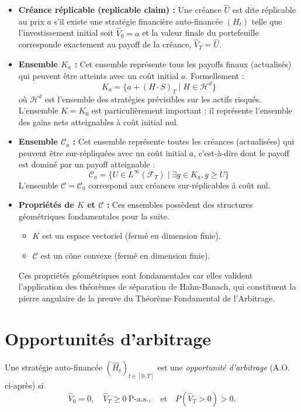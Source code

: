 \begin{itemize}
    \item \textbf{Créance réplicable (replicable claim) :} Une créance $\hat{U}$ est dite réplicable au prix $a$ s'il existe une stratégie financière auto-financée $(H_t)$ telle que l'investissement initial soit $\hat{V}_0 = a$ et la valeur finale du portefeuille corresponde exactement au payoff de la créance, $\hat{V}_T = \hat{U}$.
    \item \textbf{Ensemble $K_a$ :} Cet ensemble représente tous les payoffs finaux (actualisés) qui peuvent être atteints avec un coût initial $a$. Formellement :
    \[
    K_a = \{ a + (H \cdot S)_T \mid H \in \mathcal{H}^d \}
    \]
    où $\mathcal{H}^d$ est l'ensemble des stratégies prévisibles sur les actifs risqués. L'ensemble $K = K_0$ est particulièrement important : il représente l'ensemble des gains nets atteignables à coût initial nul.
    \item \textbf{Ensemble $\mathcal{C}_a$ :} Cet ensemble représente toutes les créances (actualisées) qui peuvent être sur-répliquées avec un coût initial $a$, c'est-à-dire dont le payoff est dominé par un payoff atteignable :
    \[
    \mathcal{C}_a = \{ U \in L^\infty(\mathcal{F}_T) \mid \exists g \in K_a, g \ge U \}
    \]
    L'ensemble $\mathcal{C} = \mathcal{C}_0$ correspond aux créances sur-réplicables à coût nul.
    \item \textbf{Propriétés de $K$ et $\mathcal{C}$ :} Ces ensembles possèdent des structures géométriques fondamentales pour la suite.
    \begin{itemize}
        \item $K$ est un espace vectoriel (fermé en dimension finie).
        \item $\mathcal{C}$ est un cône convexe (fermé en dimension finie).
    \end{itemize}
    Ces propriétés géométriques sont fondamentales car elles valident l'application des théorèmes de séparation de Hahn-Banach, qui constituent la pierre angulaire de la preuve du Théorème Fondamental de l'Arbitrage.
\end{itemize}

\section{Opportunités d'arbitrage}

\begin{definition}
Une stratégie auto-financée $(\hat H_t)_{t\in[0,T]}$ est une \emph{opportunité d'arbitrage} (A.O. ci-après) si
\begin{equation}
\hat V_0 = 0, \quad \hat V_T \ge 0 \ \text{P-a.s.}, \quad \text{et} \quad P(\hat V_T > 0) > 0.
\end{equation}
\end{definition}


